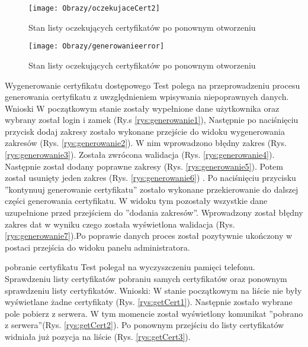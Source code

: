 \begin{enumerate*}
\begin{figure}[ht!]
		\begin{minipage}{0.3\textwidth}
			\texttt{[image: Obrazy/oczekujaceCert2]}
			\caption{Stan listy oczekujących certyfikatów po ponownym otworzeniu}
			\label{rys:generowanieCert3}
		\end{minipage}
	
	\begin{minipage}{0.3\textwidth}
		\texttt{[image: Obrazy/generowanieerror]}
		\caption{Stan listy oczekujących certyfikatów po ponownym otworzeniu}
		\label{rys:generowanieCert4}
	\end{minipage}
	
	\end{figure}
	
	\item  Wygenerowanie certyfikatu dostępowego
	Test polega na przeprowadzeniu procesu generowania certyfikatu z uwzględnieniem wpisywania niepoprawnych danych.
	Wnioski W początkowym stanie zostały wypełnione dane użytkownika oraz wybrany został login i zamek (Ry.s \ref{rys:generowanie1}), Następnie po naciśnięciu przycisk dodaj zakresy zostało wykonane przejście do widoku  wygenerowania zakresów (Rys. \ref{rys:generowanie2}). W nim wprowadzono  błędny zakres (Rys. \ref{rys:generowanie3}). Została zwrócona walidacja (Rys. \ref{rys:generowanie4}). Następnie został dodany poprawne zakresy (Rys. \ref{rys:generowanie5}). Potem został usunięty jeden zakres (Rys. \ref{rys:generowanie6})   . Po naciśnięciu przycisku ''kontynuuj generowanie certyfikatu'' zostało wykonane przekierowanie  do dalszej części generowania certyfikatu. W widoku tym pozostały wszystkie dane uzupełnione przed przejściem do ''dodania zakresów''. Wprowadzony został błędny zakres dat w wyniku czego została wyświetlona walidacja (Rys. \ref{rys:generowanie7}).Po poprawie danych proces został pozytywnie ukończony w postaci przejścia do widoku panelu administratora.
	
	\item   pobranie certyfikatu
	Test polegał na wyczyszczeniu pamięci telefonu. Sprawdzeniu listy certyfikatów pobraniu samych certyfikatów oraz ponownym sprawdzeniu listy certyfikatów.
	Wnioski: W stanie początkowym na liście nie były wyświetlane żadne certyfikaty (Rys. \ref{rys:getCert1}). Następnie zostało wybrane pole pobierz z serwera. W tym momencie został wyświetlony komunikat ''pobrano z serwera''(Rys. \ref{rys:getCert2}). Po ponownym przejściu do listy certyfikatów widniała już pozycja na liście (Rys. \ref{rys:getCert3}).
		\begin{figure}[ht!]
		

\end{figure}
\end{enumerate*}
